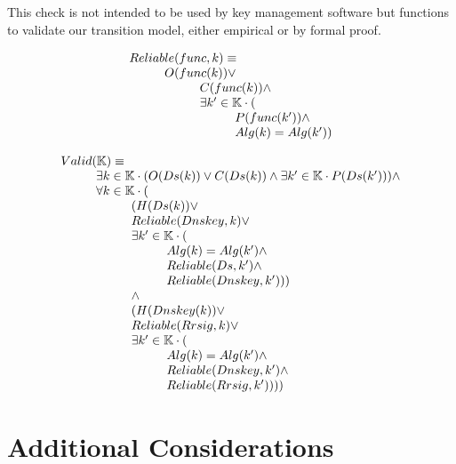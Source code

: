\documentclass[twoside, a4paper]{article}
\begin{document}
This check is not intended to be used by key management software but
functions to validate our transition model, either empirical or by 
formal proof.

\begin{equation}
\begin{array}{l}
Reliable(func, k) \equiv \\
\hskip 1cm 		O(func(k)) \vee \\
\hskip 2cm 			C(func(k)) \wedge \\
\hskip 2cm 			\exists k' \in \mathbb{K} \cdot (\\
\hskip 3cm 				P(func(k')) \wedge \\
\hskip 3cm 				Alg(k)=Alg(k'))
\end{array}
\end{equation}

\begin{equation}
\begin{array}{l}
Valid(\mathbb{K}) \equiv \\
\hskip 1cm		\exists k \in \mathbb{K} \cdot ( O(Ds(k)) \vee C(Ds(k)) \wedge \exists k' \in \mathbb{K} \cdot P(Ds(k')))
\hskip 0cm		\wedge \\
\hskip 1cm		\forall k \in \mathbb{K} \cdot (\\
\hskip 2cm			(H(Ds(k)) \vee \\
\hskip 2cm			Reliable(Dnskey, k) \vee \\
\hskip 2cm				\exists k' \in \mathbb{K} \cdot (\\
\hskip 3cm				Alg(k) = Alg(k') \wedge \\
\hskip 3cm				Reliable(Ds, k') \wedge \\
\hskip 3cm				Reliable(Dnskey, k') )) \\
\hskip 2cm			\wedge\\
\hskip 2cm			(H(Dnskey(k)) \vee \\
\hskip 2cm			Reliable(Rrsig, k) \vee \\
\hskip 2cm			\exists k' \in \mathbb{K} \cdot (\\
\hskip 3cm				Alg(k) = Alg(k') \wedge \\
\hskip 3cm				Reliable(Dnskey, k') \wedge \\
\hskip 3cm				Reliable(Rrsig, k') )))
\end{array}
\end{equation}

\section{Additional Considerations}
\end{document}
